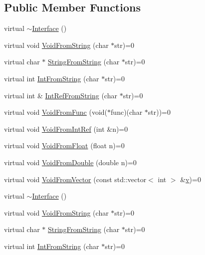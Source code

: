 \subsection*{Public Member Functions}
\begin{DoxyCompactItemize}
\item 
virtual \mbox{\hyperlink{class_interface_a67eca71a4ef8d28dc959dd495e2b2b59}{$\sim$\+Interface}} ()
\item 
virtual void \mbox{\hyperlink{class_interface_a65d6ae604e7e9a513aec72c9c94e0b97}{Void\+From\+String}} (char $\ast$str)=0
\item 
virtual char $\ast$ \mbox{\hyperlink{class_interface_a756b1d22c12aa3f14a5083f90043fbf0}{String\+From\+String}} (char $\ast$str)=0
\item 
virtual int \mbox{\hyperlink{class_interface_ab34c8a5fd2236a6b009f86a4e5851b61}{Int\+From\+String}} (char $\ast$str)=0
\item 
virtual int \& \mbox{\hyperlink{class_interface_ab93276de67e60c44fd775d4c139aa8e1}{Int\+Ref\+From\+String}} (char $\ast$str)=0
\item 
virtual void \mbox{\hyperlink{class_interface_a7dab3c82b857a9a5f52b3ce6f7df547f}{Void\+From\+Func}} (void($\ast$func)(char $\ast$str))=0
\item 
virtual void \mbox{\hyperlink{class_interface_aa43fb56650a57b6b3e7743e54e50cb86}{Void\+From\+Int\+Ref}} (int \&n)=0
\item 
virtual void \mbox{\hyperlink{class_interface_ae2b3e9411c893a45642d3af632752c66}{Void\+From\+Float}} (float n)=0
\item 
virtual void \mbox{\hyperlink{class_interface_aa56524017aabdbe46510648c711ab8a8}{Void\+From\+Double}} (double n)=0
\item 
virtual void \mbox{\hyperlink{class_interface_ae84fe7e53f881db2f823ad35d004927a}{Void\+From\+Vector}} (const std\+::vector$<$ int $>$ \&\mbox{\hyperlink{_important_values_8h_aaad811047eb9ea3edb6ec2bbeddb2b2b}{v}})=0
\item 
virtual \mbox{\hyperlink{class_interface_a67eca71a4ef8d28dc959dd495e2b2b59}{$\sim$\+Interface}} ()
\item 
virtual void \mbox{\hyperlink{class_interface_a65d6ae604e7e9a513aec72c9c94e0b97}{Void\+From\+String}} (char $\ast$str)=0
\item 
virtual char $\ast$ \mbox{\hyperlink{class_interface_a756b1d22c12aa3f14a5083f90043fbf0}{String\+From\+String}} (char $\ast$str)=0
\item 
virtual int \mbox{\hyperlink{class_interface_ab34c8a5fd2236a6b009f86a4e5851b61}{Int\+From\+String}} (char $\ast$str)=0

\end{DoxyCompactItemize}
